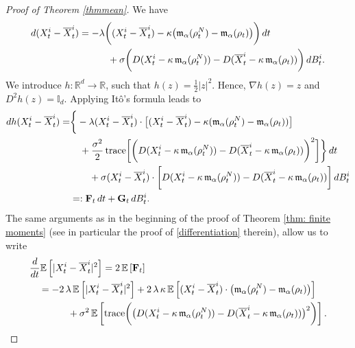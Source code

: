 \documentclass[12pt]{amsart}
\newcommand{\rd}{{\rm d} }
\newcommand{\EE}{{\mathbb E}}
\numberwithin{equation}{section}
\begin{document}
\begin{proof}[Proof of Theorem \ref{thmmean}] 
We have 
\begin{align*}
    \rd (X^{i}_{t} - \overline{X}^{i}_{t}) & = - \lambda \bigg((X^{i}_{t} - \overline{X}^{i}_{t}) - \kappa \big(\mathfrak{m}_{\alpha}(\rho^{N}_{t}) - \mathfrak{m}_{\alpha}(\rho_{t})\big)\bigg)\,\rd t\\
    & \quad \quad \quad + \sigma\bigg( D(X^{i}_{t} - \kappa\, \mathfrak{m}_{\alpha}(\rho^{N}_{t})) - D(\overline{X}^{i}_{t} - \kappa\,\mathfrak{m}_{\alpha}(\rho_{t})) \bigg)\, \rd B^{i}_{t}.
\end{align*}
We introduce $h:\mathbb{R}^{d}\to \mathbb{R}$, such that $h(z) = \frac{1}{2}|z|^{2}$. Hence, $\nabla h(z) = z$ and $D^{2}h(z) = \mathds{I}_{d}$. 
Applying It\^o's formula leads to 
\begin{align*}
    \rd h(X^{i}_{t} - \overline{X}^{i}_{t}) = 
    & \bigg\{ -\lambda (X^{i}_{t} - \overline{X}^{i}_{t})\cdot \big[(X^{i}_{t} - \overline{X}^{i}_{t}) - \kappa(\mathfrak{m}_{\alpha}(\rho^{N}_{t}) - \mathfrak{m}_{\alpha}(\rho_{t}))\big]\\
    & \quad + \frac{\sigma^{2}}{2}\,\text{trace}\bigg[\bigg( D(X^{i}_{t} - \kappa\, \mathfrak{m}_{\alpha}(\rho^{N}_{t})) - D(\overline{X}^{i}_{t} - \kappa\,\mathfrak{m}_{\alpha}(\rho_{t})) \bigg)^{2}\bigg]\bigg\}\,\rd t\\
    & \quad \quad + \sigma (X^{i}_{t} - \overline{X}^{i}_{t})\cdot \bigg[D(X^{i}_{t} - \kappa\, \mathfrak{m}_{\alpha}(\rho^{N}_{t})) - D(\overline{X}^{i}_{t} - \kappa\,\mathfrak{m}_{\alpha}(\rho_{t}))\bigg]\,\rd B^{i}_{t}\\
    & =: \mathbf{F}_{t}\,\rd t + \mathbf{G}_{t}\, \rd B^{i}_{t}.
\end{align*}
The same arguments as in the beginning of the proof of Theorem \ref{thm: finite moments} (see in particular the proof of \eqref{differentiation} therein), allow us to write
\begin{align*}
    & \frac{\rd}{\rd t}\EE\left[|X^{i}_{t} - \overline{X}^{i}_{t}|^{2}\right]  = 2 \, \EE\left[\mathbf{F}_{t}\right]\\
    & \quad = -2\,\lambda\, \EE\left[|X^{i}_{t} - \overline{X}^{i}_{t}|^{2}\right] + 2\,\lambda\,\kappa\, \EE\left[(X^{i}_{t} - \overline{X}^{i}_{t})\cdot \big(\mathfrak{m}_{\alpha}(\rho^{N}_{t}) - \mathfrak{m}_{\alpha}(\rho_{t})\big)\right]\\
    & \quad \quad \quad \quad + \sigma^{2}\,\EE\left[\text{trace}\bigg(\big( D(X^{i}_{t} - \kappa\, \mathfrak{m}_{\alpha}(\rho^{N}_{t})) - D(\overline{X}^{i}_{t} - \kappa\,\mathfrak{m}_{\alpha}(\rho_{t})) \big)^{2}\bigg)\right]. 

\end{align*}
\end{proof}
\end{document}
